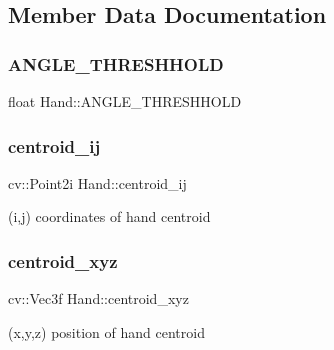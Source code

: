 \subsection{Member Data Documentation}
\hypertarget{class_hand_aae06e06e724346861df0a7fdddcfc3c8}{}\label{class_hand_aae06e06e724346861df0a7fdddcfc3c8} 
\subsubsection{\texorpdfstring{A\+N\+G\+L\+E\+\_\+\+T\+H\+R\+E\+S\+H\+H\+O\+LD}{ANGLE\_THRESHHOLD}}
{\footnotesize\ttfamily float Hand\+::\+A\+N\+G\+L\+E\+\_\+\+T\+H\+R\+E\+S\+H\+H\+O\+LD\hspace{0.3cm}{\ttfamily [private]}}

\hypertarget{class_hand_a1b7c44a205ea0ec4a89a24abc8ce84af}{}\label{class_hand_a1b7c44a205ea0ec4a89a24abc8ce84af} 
\subsubsection{\texorpdfstring{centroid\+\_\+ij}{centroid\_ij}}
{\footnotesize\ttfamily cv\+::\+Point2i Hand\+::centroid\+\_\+ij}



(i,j) coordinates of hand centroid 

\hypertarget{class_hand_af1d336666d556ea9d900bdd7bae6b88c}{}\label{class_hand_af1d336666d556ea9d900bdd7bae6b88c} 
\subsubsection{\texorpdfstring{centroid\+\_\+xyz}{centroid\_xyz}}
{\footnotesize\ttfamily cv\+::\+Vec3f Hand\+::centroid\+\_\+xyz}



(x,y,z) position of hand centroid 

\hypertarget{class_hand_a8fee584c52a9c38a8c9500b86859a610}{}\label{class_hand_a8fee584c52a9c38a8c9500b86859a610} 
